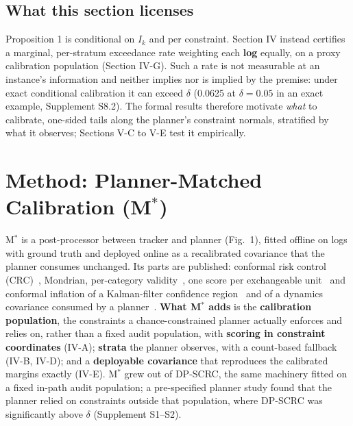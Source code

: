 \documentclass{ieeeaccess}
\begin{document}
\subsection{What this section licenses}
Proposition 1 is conditional on $I_{k}$ and per constraint. Section IV instead certifies a marginal, per-stratum exceedance rate weighting each \textbf{log} equally, on a proxy calibration population (Section IV-G). Such a rate is not measurable at an instance's information and neither implies nor is implied by the premise: under exact conditional calibration it can exceed $\delta$ (0.0625 at $\delta = 0.05$ in an exact example, Supplement S8.2). The formal results therefore motivate \emph{what} to calibrate, one-sided tails along the planner's constraint normals, stratified by what it observes; Sections V-C to V-E test it empirically.

\section{Method: Planner-Matched Calibration (M$^{*}$)}
M$^{*}$ is a post-processor between tracker and planner (Fig.~1), fitted offline on logs with ground truth and deployed online as a recalibrated covariance that the planner consumes unchanged. Its parts are published: conformal risk control (CRC)~\cite{Angelopoulos2024}, Mondrian, per-category validity~\cite{Vovk2012}, one score per exchangeable unit~\cite{Dunn2023} and conformal inflation of a Kalman-filter confidence region~\cite{Weisman2026} and of a dynamics covariance consumed by a planner~\cite{Marques2026a}. \textbf{What M$^{*}$ adds} is the \textbf{calibration population}, the constraints a chance-constrained planner actually enforces and relies on, rather than a fixed audit population, with \textbf{scoring in constraint coordinates} (IV-A); \textbf{strata} the planner observes, with a count-based fallback (IV-B, IV-D); and a \textbf{deployable covariance} that reproduces the calibrated margins exactly (IV-E). M$^{*}$ grew out of DP-SCRC, the same machinery fitted on a fixed in-path audit population; a pre-specified planner study found that the planner relied on constraints outside that population, where DP-SCRC was significantly above $\delta$ (Supplement S1--S2).
\end{document}
